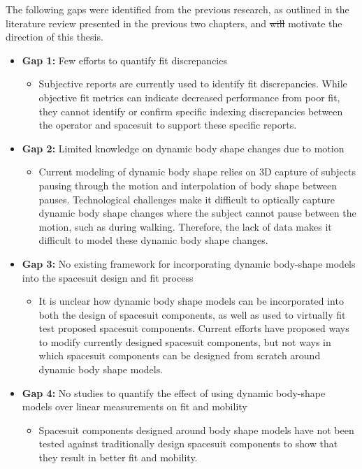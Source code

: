 \documentclass[defaultstyle,11pt]{comps}
\providecommand{\tightlist}{%
  \setlength{\itemsep}{0pt}\setlength{\parskip}{0pt}}
\providecommand{\DIFdeltex}[1]{{\protect\color{red}\sout{#1}}}                      %
\providecommand{\DIFdelbegin}{} %
\providecommand{\DIFdelend}{} %
\providecommand{\DIFdel}[1]{\texorpdfstring{\DIFdeltex{#1}}{}} %
\newcommand{\DIFscaledelfig}{0.5}
\newlength{\DIFdelgraphicswidth} %
\newlength{\DIFdelgraphicsheight} %
\newcommand{\DIFdelincludegraphics}[2][]{%
\sbox{\DIFdelgraphicsbox}{\DIFOincludegraphics[#1]{#2}}%
\settoboxwidth{\DIFdelgraphicswidth}{\DIFdelgraphicsbox} %
\settoboxtotalheight{\DIFdelgraphicsheight}{\DIFdelgraphicsbox} %
\scalebox{\DIFscaledelfig}{%
\parbox[b]{\DIFdelgraphicswidth}{\usebox{\DIFdelgraphicsbox}\\[-\baselineskip] \rule{\DIFdelgraphicswidth}{0em}}\llap{\resizebox{\DIFdelgraphicswidth}{\DIFdelgraphicsheight}{%
\setlength{\unitlength}{\DIFdelgraphicswidth}%
\begin{picture}(1,1)%
\thicklines\linethickness{2pt} %
{\color[rgb]{1,0,0}\put(0,0){\framebox(1,1){}}}%
{\color[rgb]{1,0,0}\put(0,0){\line( 1,1){1}}}%
{\color[rgb]{1,0,0}\put(0,1){\line(1,-1){1}}}%
\end{picture}%
}\hspace*{3pt}}} %
} %
\DeclareRobustCommand{\DIFdelbegin}{\DIFOdelbegin \let\includegraphics\DIFdelincludegraphics} %
\DeclareRobustCommand{\DIFdelend}{\DIFOaddend \let\includegraphics\DIFOincludegraphics} %
\begin{document}
The following gaps were identified from the previous research, as outlined in the literature review presented in the previous two chapters, and \DIFdelbegin \DIFdel{will }\DIFdelend motivate the direction of this thesis.

\begin{itemize}
\tightlist
\item
  \textbf{Gap 1:} Few efforts to quantify fit discrepancies

  \begin{itemize}
  \tightlist
  \item
    Subjective reports are currently used to identify fit discrepancies.
    While objective fit metrics can indicate decreased performance from poor fit, they cannot identify or confirm specific indexing discrepancies between the operator and spacesuit to support these specific reports.
  \end{itemize}
\item
  \textbf{Gap 2:} Limited knowledge on dynamic body shape changes due to motion

  \begin{itemize}
  \tightlist
  \item
    Current modeling of dynamic body shape relies on 3D capture of subjects pausing through the motion and interpolation of body shape between pauses.
    Technological challenges make it difficult to optically capture dynamic body shape changes where the subject cannot pause between the motion, such as during walking.
    Therefore, the lack of data makes it difficult to model these dynamic body shape changes.
  \end{itemize}
\item
  \textbf{Gap 3:} No existing framework for incorporating dynamic body-shape models into the spacesuit design and fit process

  \begin{itemize}
  \tightlist
  \item
    It is unclear how dynamic body shape models can be incorporated into both the design of spacesuit components, as well as used to virtually fit test proposed spacesuit components.
    Current efforts have proposed ways to modify currently designed spacesuit components, but not ways in which spacesuit components can be designed from scratch around dynamic body shape models.
  \end{itemize}
\item
  \textbf{Gap 4:} No studies to quantify the effect of using dynamic body-shape models over linear measurements on fit and mobility

  \begin{itemize}
  \tightlist
  \item
    Spacesuit components designed around body shape models have not been tested against traditionally design spacesuit components to show that they result in better fit and mobility.
  \end{itemize}
\end{itemize}
\end{document}
